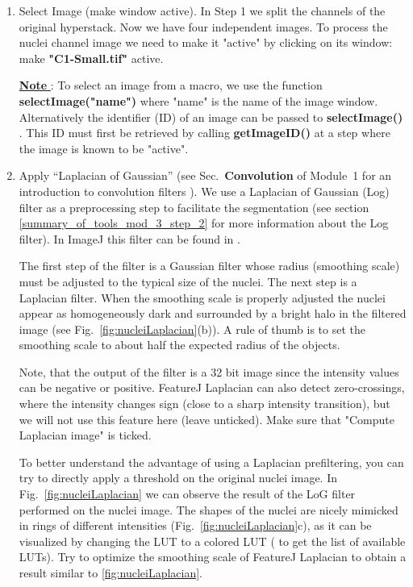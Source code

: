 \begin{enumerate}
    \item Select Image (make window active). 
    In Step 1 we split the channels of the original hyperstack. Now we have four independent images. To process the nuclei channel image we need to make it "active" by clicking on its window: make \textbf{"C1-Small.tif"} active.
    
    \underline{\textbf{Note} }: To select an image from a macro, we use the function \textbf{selectImage("name")} where "name" is the name of the image window. 
    Alternatively the identifier (ID) of an image can be passed to \textbf{selectImage()} . 
    This ID must first be retrieved by calling \textbf{getImageID()} at a step where the image is known to be "active".
\item Apply ``Laplacian of Gaussian'' (see Sec.~\textbf{Convolution} of Module~1 for an introduction to convolution filters ). We use a Laplacian of Gaussian (Log) filter as a preprocessing step to facilitate the segmentation (see section \ref{summary_of_tools_mod_3_step_2} for more information about the Log filter). In ImageJ this filter can be found in .
    
    The first step of the filter is a Gaussian filter whose radius (smoothing scale) must be adjusted to the typical size of the nuclei. The next step is a Laplacian filter. When the smoothing scale is properly adjusted the nuclei appear as homogeneously dark and surrounded by a bright halo in the filtered image (see Fig.~\ref{fig:nucleiLaplacian}(b)). A rule of thumb is to set the smoothing scale to about half the expected radius of the objects. 
    
    Note, that the output of the filter is a 32 bit image since the intensity values can be negative or positive. FeatureJ Laplacian can also detect zero-crossings, where the intensity changes sign (close to a sharp intensity transition), but we will not use this feature here (leave unticked). Make sure that "Compute Laplacian image" is ticked.
    
    To better understand the advantage of using a Laplacian prefiltering, you can try to directly apply a threshold on the original nuclei image.
In Fig.~\ref{fig:nucleiLaplacian} we can observe the result of the LoG filter performed on the nuclei image. The shapes of the nuclei are nicely mimicked in rings of different intensities (Fig.~\ref{fig:nucleiLaplacian}c), as it can be visualized by changing the LUT to a colored LUT ( to get the list of available LUTs). Try to optimize the smoothing scale of FeatureJ Laplacian to obtain a result similar to \ref{fig:nucleiLaplacian}.


\end{enumerate}
